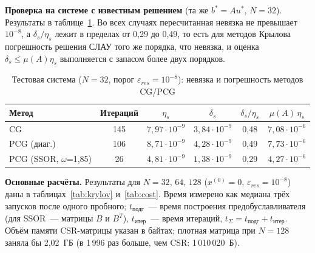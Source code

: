 \documentclass[12pt]{article}
\begin{document}
\textbf{Проверка на системе с известным решением} (та же $b^*=Au^*$, $N=32$). Результаты в таблице~\ref{tab:test_cg}. Во всех случаях пересчитанная невязка не превышает $10^{-8}$, а $\delta_s/\eta_s$ лежит в пределах от 0,29 до 0,49, то есть для методов Крылова погрешность решения СЛАУ того же порядка, что невязка, и оценка $\delta_s\le\mu(A)\eta_s$ выполняется с запасом более двух порядков.\par

\begin{table}[H]
\centering
\caption{Тестовая система ($N=32$, порог $\varepsilon_{res}=10^{-8}$): невязка и погрешность методов CG/PCG}
\label{tab:test_cg}
\small
\begin{tabular}{|l|c|c|c|c|c|}
\hline
Метод & Итераций & $\eta_s$ & $\delta_s$ & $\delta_s/\eta_s$ & $\mu(A)\,\eta_s$ \\
\hline
CG & 145 & $7{,}97\cdot10^{-9}$ & $3{,}84\cdot10^{-9}$ & 0,48 & $7{,}08\cdot10^{-6}$ \\
PCG (диаг.) & 106 & $8{,}71\cdot10^{-9}$ & $4{,}28\cdot10^{-9}$ & 0,49 & $7{,}73\cdot10^{-6}$ \\
PCG (SSOR, $\omega$=1,85) & 26 & $4{,}81\cdot10^{-9}$ & $1{,}38\cdot10^{-9}$ & 0,29 & $4{,}27\cdot10^{-6}$ \\
\hline
\end{tabular}
\end{table}

\textbf{Основные расчёты.} Результаты для $N=32,\,64,\,128$ ($x^{(0)}=0$, $\varepsilon_{res}=10^{-8}$) даны в таблицах~\ref{tab:krylov} и~\ref{tab:cost}. Время измерено как медиана трёх запусков после одного пробного; $t_\text{подг}$~--- время построения предобуславливателя (для SSOR~--- матрицы $B$ и $B^T$), $t_\text{итер}$~--- время итераций, $t_\Sigma=t_\text{подг}+t_\text{итер}$. Объём памяти CSR-матрицы указан в байтах; плотная матрица при $N=128$ заняла бы 2,02~ГБ (в 1\,996 раз больше, чем CSR: 1\,010\,020~Б).\par
\end{document}
